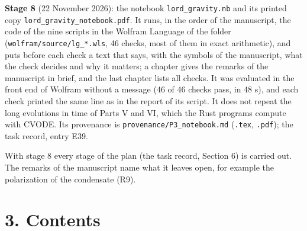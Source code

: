 \documentclass[
  10pt,
]{article}
\begin{document}
\textbf{Stage 8} (22 November 2026): the notebook
\texttt{lord\_gravity.nb} and its printed copy
\texttt{lord\_gravity\_notebook.pdf}. It runs, in the order of the
manuscript, the code of the nine scripts in the Wolfram Language of the
folder (\texttt{wolfram/source/lg\_*.wls}, 46 checks, most of them in
exact arithmetic), and puts before each check a text that says, with the
symbols of the manuscript, what the check decides and why it matters; a
chapter gives the remarks of the manuscript in brief, and the last
chapter lists all checks. It was evaluated in the front end of Wolfram
without a message (46 of 46 checks pass, in 48 s), and each check
printed the same line as in the report of its script. It does not repeat
the long evolutions in time of Parts V and VI, which the Rust programs
compute with CVODE. Its provenance is
\texttt{provenance/P3\_notebook.md} (\texttt{.tex}, \texttt{.pdf}); the
task record, entry E39.

With stage 8 every stage of the plan (the task record, Section 6) is
carried out. The remarks of the manuscript name what it leaves open, for
example the polarization of the condensate (R9).

\hypertarget{contents}{%
\section{3. Contents}\label{contents}}
\end{document}
